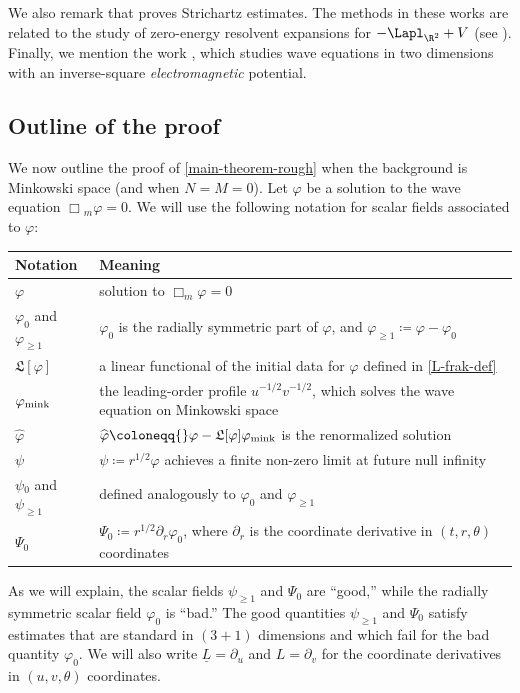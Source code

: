 \documentclass[10pt, reqno]{amsart}
\begin{document}
We also remark that \cite{BECEANU20165378} proves Strichartz estimates. The
methods in these works are related to the study of zero-energy resolvent
expansions for \(-\Lapl _{\R^2}+ V\) (see
\cite{doi:10.1142/S0129055X01000843,Erdo_an_2013}). Finally, we mention the work
\cite{FANELLI2022108333}, which studies wave equations in two dimensions with an
inverse-square \emph{electromagnetic} potential.
\subsection{Outline of the proof}
\label{proof-outline} We now outline the proof of \cref{main-theorem-rough} when the
background is Minkowski space (and when \(N = M = 0\)). Let \(\varphi{}\) be a
solution to the wave equation \(\Box{}_{m}\varphi{} = 0\). We will use the
following notation for scalar fields associated to \(\varphi{}\):
\begin{center}
\begin{tabular}{ll}
Notation & Meaning\\
\hline
\(\varphi{}\) & solution to \(\Box_m\varphi{} = 0\)\\
\(\varphi_0\) and \(\varphi_{\ge 1}\) & \(\varphi_0\) is the radially symmetric part of \(\varphi{}\), and \(\varphi_{\ge 1}\coloneqq{}\varphi{}-\varphi_0\)\\
\(\mathfrak{L}[\varphi{}]\) & a linear functional of the initial data for \(\varphi{}\) defined in \cref{L-frak-def}\\
\(\varphi_{\textnormal{mink}}\) & the leading-order profile \(u^{-1/2}v^{-1/2}\), which solves the wave equation on Minkowski space\\
\(\widehat{\varphi{}}\) & \(\widehat{\varphi{}}\coloneqq{}\varphi{}-\mathfrak{L}[\varphi{}]\varphi_{\textnormal{mink}}\) is the renormalized solution\\
\(\psi{}\) & \(\psi{}\coloneqq{}r^{1/2}\varphi{}\) achieves a finite non-zero limit at future null infinity\\
\(\psi{}_0\) and \(\psi_{\ge 1}\) & defined analogously to \(\varphi_0\) and \(\varphi_{\ge 1}\)\\
\(\Psi_0\) & \(\Psi_0\coloneqq{}r^{1/2}\partial_r\varphi_0\), where \(\partial_r\) is the coordinate derivative in \((t,r,\theta{})\) coordinates\\

\end{tabular}
\end{center}
As we will explain, the scalar fields \(\psi_{\ge 1}\) and \(\Psi_0\) are ``good,'' while
the radially symmetric scalar field \(\varphi_0\) is ``bad.'' The good quantities
\(\psi_{\ge 1}\) and \(\Psi_0\) satisfy estimates that are standard in \((3 +
1)\) dimensions and which fail for the bad quantity \(\varphi_0\). We will also
write \(\underline{L} = \partial_u\) and \(L = \partial_v\) for the coordinate
derivatives in \((u,v,\theta{})\) coordinates.
\end{document}
